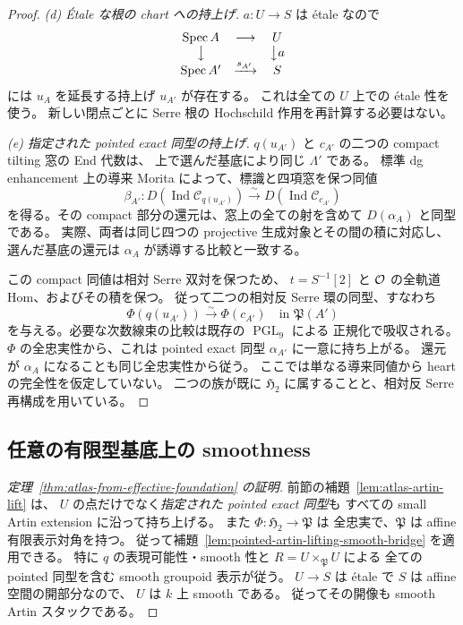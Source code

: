 \begin{proof}
\emph{(d) \'Etale な根の chart への持上げ.}
$a:U\to S$ は \'etale なので
\[
 \begin{matrix}
 \operatorname{Spec} A&\longrightarrow&U\\
 \big\downarrow&&\big\downarrow a\\
 \operatorname{Spec} A'&\xrightarrow{s_{A'}}&S
 \end{matrix}
\]
には $u_A$ を延長する持上げ $u_{A'}$ が存在する。
これは全ての $U$ 上での \'etale 性を使う。
新しい閉点ごとに Serre 根の Hochschild 作用を再計算する必要はない。

\emph{(e) 指定された pointed exact 同型の持上げ.}
$q(u_{A'})$ と $c_{A'}$ の二つの compact tilting 窓の End 代数は、
上で選んだ基底により同じ $\Lambda'$ である。
標準 dg enhancement 上の導来 Morita によって、標識と四項窓を保つ同値
\[
 \beta_{A'}:
 D(\operatorname{Ind}\mathcal C_{q(u_{A'})})
 \xrightarrow{\sim}D(\operatorname{Ind}\mathcal C_{c_{A'}})
\]
を得る。その compact 部分の還元は、窓上の全ての射を含めて
$D(\alpha_A)$ と同型である。
実際、両者は同じ四つの projective 生成対象とその間の積に対応し、
選んだ基底の還元は $\alpha_A$ が誘導する比較と一致する。

この compact 同値は相対 Serre 双対を保つため、
$t=S^{-1}[2]$ と $\mathcal O$ の全軌道 Hom、およびその積を保つ。
従って二つの相対反 Serre 環の同型、すなわち
\[
 \Phi(q(u_{A'}))\xrightarrow{\sim}\Phi(c_{A'})
 \quad\text{in }\mathfrak P(A')
\]
を与える。必要な次数線束の比較は既存の $\operatorname{PGL}_9$ による
正規化で吸収される。
$\Phi$ の全忠実性から、これは pointed exact 同型 $\alpha_{A'}$ に一意に持ち上がる。
還元が $\alpha_A$ になることも同じ全忠実性から従う。
ここでは単なる導来同値から heart の完全性を仮定していない。
二つの族が既に $\mathfrak H_2$ に属することと、相対反 Serre 再構成を用いている。
\end{proof}

\subsection{任意の有限型基底上の smoothness}

\begin{proof}[定理~\ref{thm:atlas-from-effective-foundation} の証明]
前節の補題~\ref{lem:atlas-artin-lift} は、
$U$ の点だけでなく\emph{指定された pointed exact 同型}も
すべての small Artin extension に沿って持ち上げる。
また $\Phi:\mathfrak H_2\to\mathfrak P$ は
全忠実で、$\mathfrak P$ は affine 有限表示対角を持つ。
従って補題~\ref{lem:pointed-artin-lifting-smooth-bridge}
を適用できる。
特に $q$ の表現可能性・smooth 性と
$R=U\times_{\mathfrak P}U$ による
全ての pointed 同型を含む smooth groupoid 表示が従う。
$U\to S$ は étale で $S$ は affine 空間の開部分なので、
$U$ は $k$ 上 smooth である。
従ってその開像も smooth Artin スタックである。
\end{proof}


